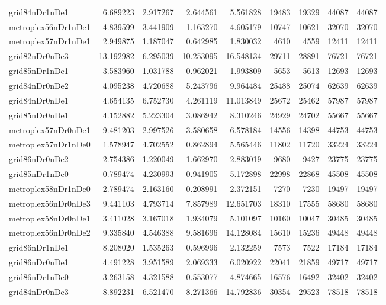 \begin{longtable}{|l|r|r|r|r|r|r|r|r|}
grid84nDr1nDe1 & 6.689223 & 2.917267 & 2.644561 & 5.561828 & 19483 & 19329 & 44087 & 44087 \\
metroplex56nDr1nDe1 & 4.839599 & 3.441909 & 1.163270 & 4.605179 & 10747 & 10621 & 32070 & 32070 \\
metroplex57nDr1nDe1 & 2.949875 & 1.187047 & 0.642985 & 1.830032 & 4610 & 4559 & 12411 & 12411 \\
grid82nDr0nDe3 & 13.192982 & 6.295039 & 10.253095 & 16.548134 & 29711 & 28891 & 76721 & 76721 \\
grid85nDr1nDe1 & 3.583960 & 1.031788 & 0.962021 & 1.993809 & 5653 & 5613 & 12693 & 12693 \\
grid84nDr0nDe2 & 4.095238 & 4.720688 & 5.243796 & 9.964484 & 25488 & 25074 & 62639 & 62639 \\
grid84nDr0nDe1 & 4.654135 & 6.752730 & 4.261119 & 11.013849 & 25672 & 25462 & 57987 & 57987 \\
grid85nDr0nDe1 & 4.152882 & 5.223304 & 3.086942 & 8.310246 & 24929 & 24702 & 55667 & 55667 \\
metroplex57nDr0nDe1 & 9.481203 & 2.997526 & 3.580658 & 6.578184 & 14556 & 14398 & 44753 & 44753 \\
metroplex57nDr1nDe0 & 1.578947 & 4.702552 & 0.862894 & 5.565446 & 11802 & 11720 & 33224 & 33224 \\
grid86nDr0nDe2 & 2.754386 & 1.220049 & 1.662970 & 2.883019 & 9680 & 9427 & 23775 & 23775 \\
grid85nDr1nDe0 & 0.789474 & 4.230993 & 0.941905 & 5.172898 & 22998 & 22868 & 45508 & 45508 \\
metroplex58nDr1nDe0 & 2.789474 & 2.163160 & 0.208991 & 2.372151 & 7270 & 7230 & 19497 & 19497 \\
metroplex56nDr0nDe3 & 9.441103 & 4.793714 & 7.857989 & 12.651703 & 18310 & 17555 & 58680 & 58680 \\
metroplex58nDr0nDe1 & 3.411028 & 3.167018 & 1.934079 & 5.101097 & 10160 & 10047 & 30485 & 30485 \\
metroplex56nDr0nDe2 & 9.335840 & 4.546388 & 9.581696 & 14.128084 & 15610 & 15236 & 49448 & 49448 \\
grid86nDr1nDe1 & 8.208020 & 1.535263 & 0.596996 & 2.132259 & 7573 & 7522 & 17184 & 17184 \\
grid86nDr0nDe1 & 4.491228 & 3.951589 & 2.069333 & 6.020922 & 22041 & 21859 & 49717 & 49717 \\
grid86nDr1nDe0 & 3.263158 & 4.321588 & 0.553077 & 4.874665 & 16576 & 16492 & 32402 & 32402 \\
grid84nDr0nDe3 & 8.892231 & 6.521470 & 8.271366 & 14.792836 & 30354 & 29523 & 78518 & 78518 \\

\end{longtable}
